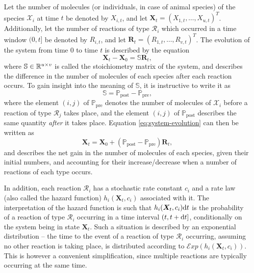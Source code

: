 Let the number of molecules (or individuals, in case of animal species) of the species $\mathcal{X}_i$ at time $t$ be denoted by $X_{i,t}$, and let $\bm{X}_t = \left(X_{1,t}, \ldots, X_{u,t}\right)^T$. Additionally, let the number of reactions of type $\mathcal{R}_i$ which occurred in a time window $(0, t]$ be denoted by $R_{i,t}$, and let $\bm{R}_t = \left(R_{1,t}, \ldots,R_{v,t}\right)^T$. The evolution of the system from time 0 to time $t$ is described by the equation
\begin{equation} \label{eq:system-evolution}
\bm{X}_t - \bm{X}_0 = \mathbb{S}\bm{R}_t,
\end{equation}
where $\mathbb{S} \in \mathbb{R}^{u \times v}$ is called the stoichiometry matrix of the system, and describes the difference in the number of molecules of each species after each reaction occurs. To gain insight into the meaning of $\mathbb{S}$, it is instructive to write it as
\begin{equation*}
\mathbb{S} = \mathbb{P}_\text{post} - \mathbb{P}_\text{pre},
\end{equation*}
where the element $(i,j)$ of $\mathbb{P}_\text{pre}$ denotes the number of molecules of $\mathcal{X}_i$ before a reaction of type $\mathcal{R}_j$ takes place, and the element $(i,j)$ of $\mathbb{P}_\text{post}$ describes the same quantity \emph{after} it takes place. Equation \eqref{eq:system-evolution} can then be written as
\begin{equation*}
\bm{X}_t = \bm{X}_0 + \left(\mathbb{P}_\text{post} - \mathbb{P}_\text{pre}\right) \bm{R}_t,
\end{equation*}
and describes the net gain in the number of molecules of each species, given their initial numbers, and accounting for their increase/decrease when a number of reactions of each type occurs.

In addition, each reaction $\mathcal{R}_i$ has a stochastic rate constant $c_i$ and a rate law (also called the hazard function) $h_i(\bm{X}_t, c_i)$ associated with it. The interpretation of the hazard function is such that $h_i(\bm{X}_t, c_i) \mathrm{d}{t}$ is the probability of a reaction of type $\mathcal{R}_i$ occurring in a time interval $(t, t + \mathrm{d}{t}]$, conditionally on the system being in state $\bm{X}_t$. Such a situation is described by an exponential distribution -- the time to the event of a reaction of type $\mathcal{R}_i$ occurring, assuming no other reaction is taking place, is distributed according to ${\mathcal{E}\mathit{xp}\left(h_i(\bm{X}_t, c_i)\right)}$. This is however a convenient simplification, since multiple reactions are typically occurring at the same time.


